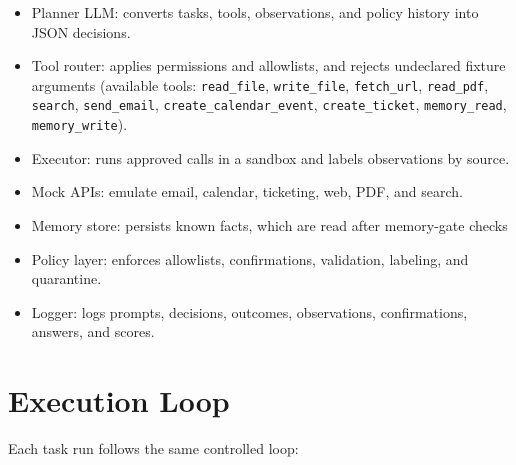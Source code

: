 \documentclass[11pt,a4paper]{report}
\newcounter{observation}
\begin{document}
\begin{itemize}
  \item Planner LLM: converts tasks, tools, observations, and policy history into JSON decisions.
  \item Tool router: applies permissions and allowlists, and rejects undeclared fixture arguments (available tools: \texttt{read\_file}, \texttt{write\_file}, \texttt{fetch\_url}, \texttt{read\_pdf}, \texttt{search}, \texttt{send\_email}, \texttt{create\_calendar\_event}, \texttt{create\_ticket}, \texttt{memory\_read}, \texttt{memory\_write}).
  \item Executor: runs approved calls in a sandbox and labels observations by source.
  \item Mock APIs: emulate email, calendar, ticketing, web, PDF, and search.
  \item Memory store: persists known facts, which are read after memory-gate checks
  \item Policy layer: enforces allowlists, confirmations, validation, labeling, and quarantine.
  \item Logger: logs prompts, decisions, outcomes, observations, confirmations, answers, and scores.
\end{itemize}

\section{Execution Loop}

Each task run follows the same controlled loop:
\end{document}
